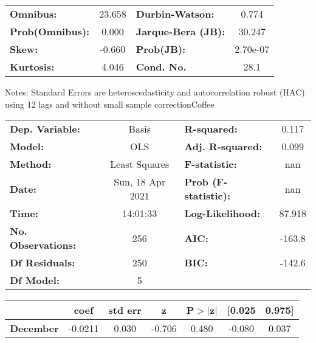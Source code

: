\begin{center}
\begin{tabular}{lcccccc}
\bottomrule
\end{tabular}
\begin{tabular}{lclc}
\textbf{Omnibus:}       & 23.658 & \textbf{  Durbin-Watson:     } &    0.774  \\
\textbf{Prob(Omnibus):} &  0.000 & \textbf{  Jarque-Bera (JB):  } &   30.247  \\
\textbf{Skew:}          & -0.660 & \textbf{  Prob(JB):          } & 2.70e-07  \\
\textbf{Kurtosis:}      &  4.046 & \textbf{  Cond. No.          } &     28.1  \\
\bottomrule
\end{tabular}
\end{center}

Notes: \newline
 [1] Standard Errors are heteroscedasticity and autocorrelation robust (HAC) using 12 lags and without small sample correctionCoffee\begin{center}
\begin{tabular}{lclc}
\toprule
\textbf{Dep. Variable:}    &      Basis       & \textbf{  R-squared:         } &     0.117   \\
\textbf{Model:}            &       OLS        & \textbf{  Adj. R-squared:    } &     0.099   \\
\textbf{Method:}           &  Least Squares   & \textbf{  F-statistic:       } &       nan   \\
\textbf{Date:}             & Sun, 18 Apr 2021 & \textbf{  Prob (F-statistic):} &      nan    \\
\textbf{Time:}             &     14:01:33     & \textbf{  Log-Likelihood:    } &    87.918   \\
\textbf{No. Observations:} &         256      & \textbf{  AIC:               } &    -163.8   \\
\textbf{Df Residuals:}     &         250      & \textbf{  BIC:               } &    -142.6   \\
\textbf{Df Model:}         &           5      & \textbf{                     } &             \\
\bottomrule
\end{tabular}
\begin{tabular}{lcccccc}
                  & \textbf{coef} & \textbf{std err} & \textbf{z} & \textbf{P$> |$z$|$} & \textbf{[0.025} & \textbf{0.975]}  \\
\midrule
\textbf{December} &      -0.0211  &        0.030     &    -0.706  &         0.480        &       -0.080    &        0.037     \\

\end{tabular}
\end{center}
